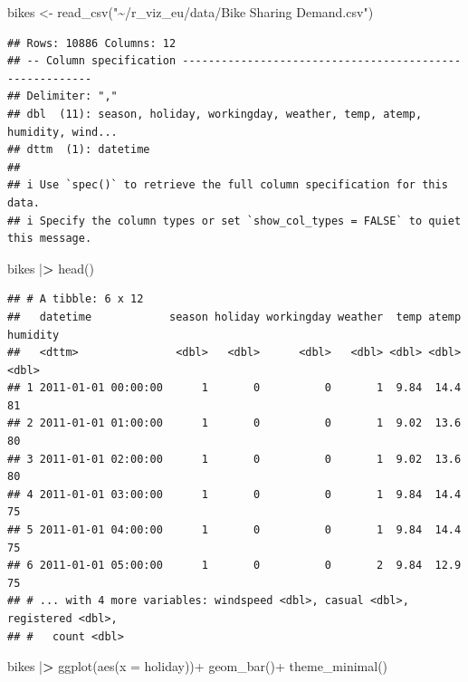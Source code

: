 \documentclass[
]{article}
\newenvironment{Shaded}{\begin{snugshade}}{\end{snugshade}}
\newcommand{\AttributeTok}[1]{\textcolor[rgb]{0.77,0.63,0.00}{#1}}
\newcommand{\ErrorTok}[1]{\textcolor[rgb]{0.64,0.00,0.00}{\textbf{#1}}}
\newcommand{\FunctionTok}[1]{\textcolor[rgb]{0.00,0.00,0.00}{#1}}
\newcommand{\NormalTok}[1]{#1}
\newcommand{\OtherTok}[1]{\textcolor[rgb]{0.56,0.35,0.01}{#1}}
\newcommand{\SpecialCharTok}[1]{\textcolor[rgb]{0.00,0.00,0.00}{#1}}
\newcommand{\StringTok}[1]{\textcolor[rgb]{0.31,0.60,0.02}{#1}}
\begin{document}
\begin{Shaded}
\begin{Highlighting}[]
\NormalTok{bikes }\OtherTok{\textless{}{-}} \FunctionTok{read\_csv}\NormalTok{(}\StringTok{"\textasciitilde{}/r\_viz\_eu/data/Bike Sharing Demand.csv"}\NormalTok{)}
\end{Highlighting}
\end{Shaded}

\begin{verbatim}
## Rows: 10886 Columns: 12
## -- Column specification --------------------------------------------------------
## Delimiter: ","
## dbl  (11): season, holiday, workingday, weather, temp, atemp, humidity, wind...
## dttm  (1): datetime
## 
## i Use `spec()` to retrieve the full column specification for this data.
## i Specify the column types or set `show_col_types = FALSE` to quiet this message.
\end{verbatim}

\begin{Shaded}
\begin{Highlighting}[]
\NormalTok{bikes }\SpecialCharTok{|}\ErrorTok{\textgreater{}} \FunctionTok{head}\NormalTok{()}
\end{Highlighting}
\end{Shaded}

\begin{verbatim}
## # A tibble: 6 x 12
##   datetime            season holiday workingday weather  temp atemp humidity
##   <dttm>               <dbl>   <dbl>      <dbl>   <dbl> <dbl> <dbl>    <dbl>
## 1 2011-01-01 00:00:00      1       0          0       1  9.84  14.4       81
## 2 2011-01-01 01:00:00      1       0          0       1  9.02  13.6       80
## 3 2011-01-01 02:00:00      1       0          0       1  9.02  13.6       80
## 4 2011-01-01 03:00:00      1       0          0       1  9.84  14.4       75
## 5 2011-01-01 04:00:00      1       0          0       1  9.84  14.4       75
## 6 2011-01-01 05:00:00      1       0          0       2  9.84  12.9       75
## # ... with 4 more variables: windspeed <dbl>, casual <dbl>, registered <dbl>,
## #   count <dbl>
\end{verbatim}

\begin{Shaded}
\begin{Highlighting}[]
\NormalTok{bikes }\SpecialCharTok{|}\ErrorTok{\textgreater{}} 
  \FunctionTok{ggplot}\NormalTok{(}\FunctionTok{aes}\NormalTok{(}\AttributeTok{x =}\NormalTok{ holiday))}\SpecialCharTok{+}
  \FunctionTok{geom\_bar}\NormalTok{()}\SpecialCharTok{+}
  \FunctionTok{theme\_minimal}\NormalTok{()}
\end{Highlighting}
\end{Shaded}
\end{document}
